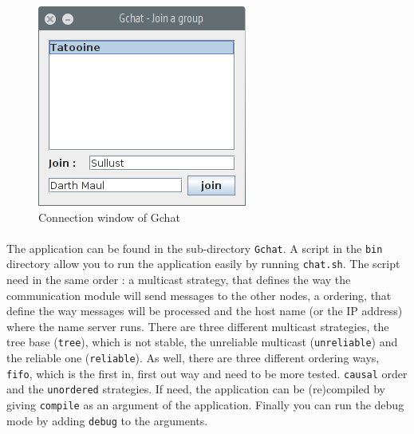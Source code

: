 \begin{figure}[h]
    \begin{center}
        \includegraphics[scale=0.6]{figures/gchat_connection.png}
    \end{center}
    \caption{Connection window of Gchat}
    \label{fig:gchat_connect}
\end{figure}

\paragraph{}{
    The application can be found in the sub-directory \texttt{Gchat}. 
 A script in the \texttt{bin} directory allow you to run the application easily
 by running \texttt{chat.sh}. The script need in the same order : a multicast 
 strategy, that defines the way the communication module will send messages to
 the other nodes, a ordering, that define the way messages will be processed and
 the host name (or the IP address) where the name server runs. \newline
 There are three different multicast strategies, the tree base (\texttt{tree}),
 which is not stable, the unreliable multicast (\texttt{unreliable}) and the
 reliable one (\texttt{reliable}). \newline
 As well, there are three different ordering ways, \texttt{fifo}, which is the
 first in, first out way and need to be more tested. \texttt{causal} order and
 the \texttt{unordered} strategies. \newline
 If need, the application can be (re)compiled by giving \texttt{compile} as an
 argument of the application. Finally you can run the debug mode by adding 
 \texttt{debug} to the arguments.
}

